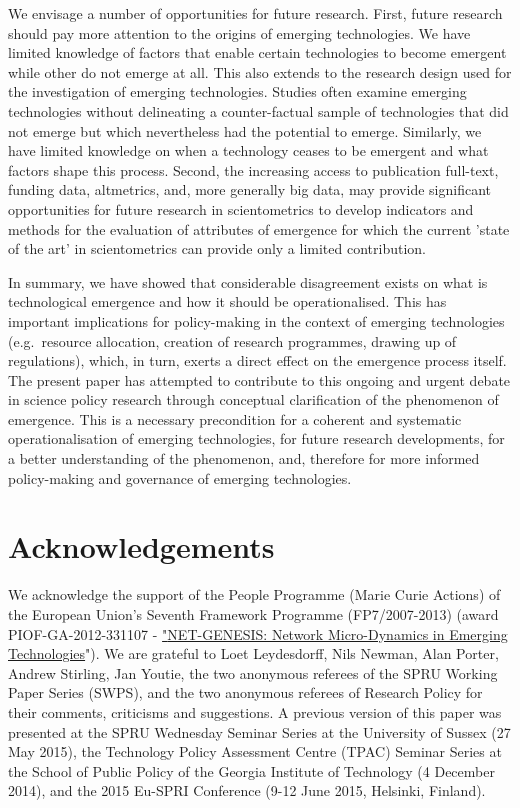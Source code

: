 \documentclass[11pt]{article}
\begin{document}
We envisage a number of opportunities for future research.  First, future research should pay more attention to the origins of emerging technologies. We have limited knowledge of factors that enable certain technologies to become emergent while other do not emerge at all. This also extends to the research design used for the investigation of emerging technologies. Studies often examine emerging technologies without delineating a counter-factual sample of technologies that did not emerge but which nevertheless had the potential to emerge. Similarly, we have limited knowledge on when a technology ceases to be emergent and what factors shape this process. Second, the increasing access to publication full-text, funding data, altmetrics, and, more generally big data, may provide significant opportunities for future research in scientometrics to develop indicators and methods for the evaluation of attributes of emergence for which the current 'state of the art' in scientometrics can provide only a limited contribution. 

In summary, we have showed that considerable disagreement exists on what is technological emergence and how it should be operationalised. This has important implications for policy-making in the context of emerging technologies (e.g.\ resource allocation, creation of research programmes, drawing up of regulations), which, in turn, exerts a direct effect on the emergence process itself. The present paper has attempted to contribute to this ongoing and urgent debate in science policy research through conceptual clarification of the phenomenon of emergence. This is a necessary precondition for a coherent and systematic operationalisation of emerging technologies, for future research developments, for a better understanding of the phenomenon, and, therefore for more informed policy-making and governance of emerging technologies.


\section*{Acknowledgements}
We acknowledge the support of the People Programme (Marie Curie Actions) of the European Union's Seventh Framework Programme (FP7/2007-2013) (award PIOF-GA-2012-331107 - \href{http://www.danielerotolo.com/netgenesis}{"{\color{blue}NET-GENESIS: Network Micro-Dynamics in Emerging Technologies}}"). We are grateful to Loet Leydesdorff, Nils Newman, Alan Porter, Andrew Stirling, Jan Youtie, the two anonymous referees of the SPRU Working Paper Series (SWPS), and the two anonymous referees of Research Policy for their comments, criticisms and suggestions. A previous version of this paper was presented at the SPRU Wednesday Seminar Series at the University of Sussex (27 May 2015), the Technology Policy Assessment Centre (TPAC) Seminar Series at the School of Public Policy of the Georgia Institute of Technology (4 December 2014), and the 2015 Eu-SPRI Conference (9-12 June 2015, Helsinki, Finland).
\end{document}
